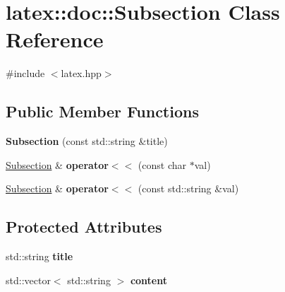 \hypertarget{classlatex_1_1doc_1_1Subsection}{\section{latex\-:\-:doc\-:\-:\-Subsection \-Class \-Reference}
\label{classlatex_1_1doc_1_1Subsection}
}


{\ttfamily \#include $<$latex.\-hpp$>$}

\subsection*{\-Public \-Member \-Functions}
\begin{DoxyCompactItemize}
\item 
\hypertarget{classlatex_1_1doc_1_1Subsection_a58c86ee6e9d450b75d84a5c4e91ad54a}{{\bfseries \-Subsection} (const std\-::string \&title)}\label{classlatex_1_1doc_1_1Subsection_a58c86ee6e9d450b75d84a5c4e91ad54a}

\item 
\hypertarget{classlatex_1_1doc_1_1Subsection_a8c8a6a26148c2316ca8f512ae35ad8da}{\hyperlink{classlatex_1_1doc_1_1Subsection}{\-Subsection} \& {\bfseries operator$<$$<$} (const char $\ast$val)}\label{classlatex_1_1doc_1_1Subsection_a8c8a6a26148c2316ca8f512ae35ad8da}

\item 
\hypertarget{classlatex_1_1doc_1_1Subsection_a7efa65925d268faf43e353a52041e230}{\hyperlink{classlatex_1_1doc_1_1Subsection}{\-Subsection} \& {\bfseries operator$<$$<$} (const std\-::string \&val)}\label{classlatex_1_1doc_1_1Subsection_a7efa65925d268faf43e353a52041e230}

\end{DoxyCompactItemize}
\subsection*{\-Protected \-Attributes}
\begin{DoxyCompactItemize}
\item 
\hypertarget{classlatex_1_1doc_1_1Subsection_a8d54abcb5a9364cf63e9279b40cfcbf6}{std\-::string {\bfseries title}}\label{classlatex_1_1doc_1_1Subsection_a8d54abcb5a9364cf63e9279b40cfcbf6}

\item 
\hypertarget{classlatex_1_1doc_1_1Subsection_a6d79b427fd95a046a292184777212a3f}{std\-::vector$<$ std\-::string $>$ {\bfseries content}}\label{classlatex_1_1doc_1_1Subsection_a6d79b427fd95a046a292184777212a3f}

\end{DoxyCompactItemize}
